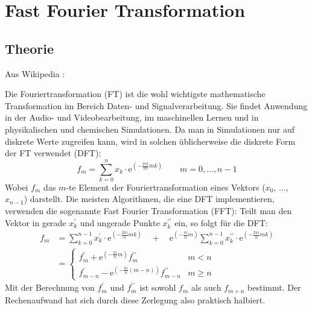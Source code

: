 	\section{Fast Fourier Transformation}
		\subsection{Theorie}
		Aus Wikipedia \autocite{wikiFFT}:
		
		Die Fouriertransformation (FT) ist die wohl wichtigste mathematische Transformation im Bereich Daten- und Signalverarbeitung. Sie findet Anwendung in der Audio- und Videobearbeitung, im maschinellen Lernen und in physikalischen und chemischen Simulationen. Da man in Simulationen nur auf diskrete Werte zugreifen kann, wird in solchen üblicherweise die diskrete Form der FT verwendet (DFT):
		\begin{equation}
			f_m = \sum^n_{k=0}x_k\cdot\mathrm{e}^{\left(-\frac{2\pi i}{2n}mk\right)}\qquad m=0,...,n-1
		\end{equation}
		Wobei $f_m$ das $m$-te Element der Fouriertransformation eines Vektors ($x_0$, ..., $x_{n-1}$) darstellt. Die meisten Algorithmen, die eine DFT implementieren, verwenden die sogenannte Fast Fourier Transformation (FFT): Teilt man den Vektor in gerade $x^{\prime}_k$ und ungerade Punkte $x^{\prime\prime}_k$ ein, so folgt für die DFT:
		\begin{align}
		f_m &= \sum_{k=0}^{n-1}x^{\prime}_k\cdot\mathrm{e}^{\left(-\frac{2\pi i}{n}mk\right)} \quad + \quad \mathrm{e}^{\left(-\frac{\pi i}{n}m\right)}\sum_{k=0}^{n-1}x^{\prime\prime}_k\cdot\mathrm{e}^{\left(-\frac{2\pi i}{n}mk\right)} \\
		&= \begin{cases} 
		f^{\prime}_m     + \mathrm{e}^{\left(-\frac{\pi i}{n}m\right)}    f^{\prime\prime}_m     & m < n \\
		f^{\prime}_{m-n} - \mathrm{e}^{\left(-\frac{\pi i}{n}(m-n)\right)}f^{\prime\prime}_{m-n} & m \geq n 
		\end{cases}
		\end{align}
		Mit der Berechnung von $f^{\prime}_m$ und $f^{\prime\prime}_m$ ist sowohl $f_m$ als auch $f_{m+n}$ bestimmt. Der Rechenaufwand hat sich durch diese Zerlegung also praktisch halbiert. 
		
